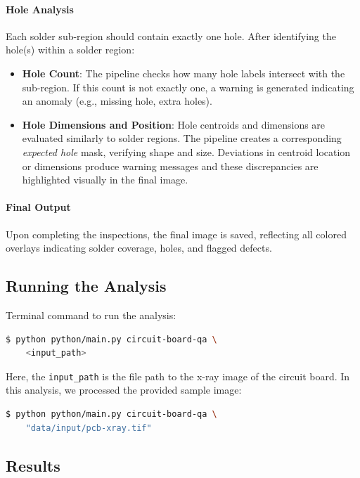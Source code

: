 \documentclass[a4paper,12pt]{article}
\begin{document}
\paragraph{Hole Analysis}

Each solder sub-region should contain exactly one hole. After identifying the hole(s) within a solder region:
\begin{itemize}
    \item \textbf{Hole Count}: The pipeline checks how many hole labels intersect with the sub-region. If this count is not exactly one, a warning is generated indicating an anomaly (e.g., missing hole, extra holes).
    \item \textbf{Hole Dimensions and Position}: Hole centroids and dimensions are evaluated similarly to solder regions. The pipeline creates a corresponding \emph{expected hole} mask, verifying shape and size. Deviations in centroid location or dimensions produce warning messages and these discrepancies are highlighted visually in the final image.
\end{itemize}

\paragraph{Final Output}

Upon completing the inspections, the final image is saved, reflecting all colored overlays indicating solder coverage, holes, and flagged defects.

\subsection{Running the Analysis}

Terminal command to run the analysis:

\begin{lstlisting}[language=bash]
$ python python/main.py circuit-board-qa \
    <input_path>
\end{lstlisting}

Here, the \texttt{input\_path} is the file path to the x-ray image of the circuit board. In this analysis, we processed the provided sample image:

\begin{lstlisting}[language=bash]
$ python python/main.py circuit-board-qa \
    "data/input/pcb-xray.tif"
\end{lstlisting}

\subsection{Results}
\end{document}
